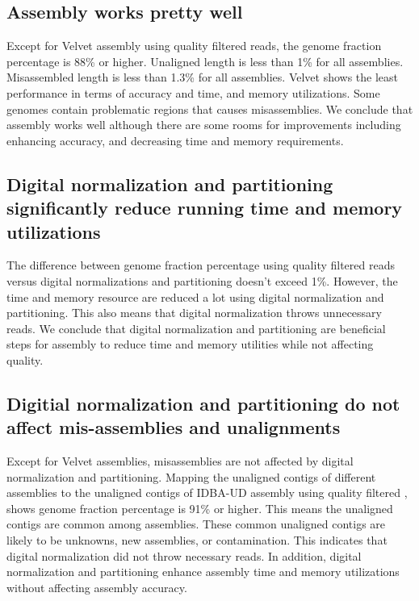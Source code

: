  \subsection*{Assembly works pretty well} 
 Except for Velvet assembly using quality filtered reads, the genome fraction percentage is  88\% or higher.  Unaligned length is less than 1\% for all assemblies.
 Misassembled length is less than 1.3\% for all assemblies. Velvet shows the least performance in terms of accuracy and time, and memory utilizations. Some genomes contain problematic regions that causes misassemblies. We conclude that assembly works well although there are some rooms for improvements including enhancing accuracy, and decreasing time and memory requirements. 
  
 \subsection*{Digital normalization and partitioning significantly reduce running time and memory utilizations}
 
The difference between genome fraction percentage using quality filtered reads versus digital normalizations and partitioning doesn't exceed 1\%. However, the time and memory resource are reduced a lot using digital normalization and partitioning. This also means that digital normalization throws unnecessary reads.
We conclude that digital normalization and partitioning are beneficial steps for assembly to reduce time and memory utilities while not affecting quality.   

 \subsection*{Digitial normalization and partitioning do not  affect mis-assemblies and unalignments}
 
Except for Velvet assemblies, misassemblies are not affected by digital normalization and partitioning. 
Mapping the unaligned  contigs of different assemblies to the unaligned contigs of  IDBA-UD  assembly using quality filtered , shows genome fraction percentage is 91\% or higher. This means the unaligned contigs are common among assemblies. These common unaligned contigs are likely to be unknowns, new assemblies, or contamination. This indicates that digital normalization did not throw necessary reads. In addition, digital normalization and partitioning enhance assembly time and memory utilizations without affecting assembly accuracy.  

